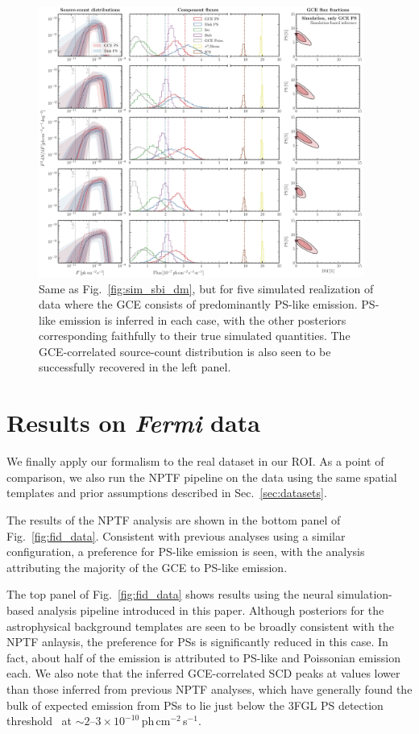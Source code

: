 \documentclass[prd,aps,10pt,nofootinbib,twocolumn,superscriptaddress,preprintnumbers,balancelastpage,longbibliography]{revtex4-1}
\begin{document}
%
\begin{figure}
    \centering
    \includegraphics[width=0.95\textwidth]{plots/sim_sbi_ps.pdf}
    \caption{Same as Fig.~\ref{fig:sim_sbi_dm}, but for five simulated realization of \Fermi data where the GCE consists of predominantly PS-like emission. PS-like emission is inferred in each case, with the other posteriors corresponding faithfully to their true simulated quantities. The GCE-correlated source-count distribution is also seen to be successfully recovered in the left panel.}
    \label{fig:sim_sbi_ps}
\end{figure}
%

\section{Results on \emph{Fermi} data}
\label{sec:data}

We finally apply our formalism to the real \Fermi dataset in our ROI. As a point of comparison, we also run the NPTF pipeline on the data using the same spatial templates and prior assumptions described in Sec.~\ref{sec:datasets}. 

The results of the NPTF analysis are shown in the bottom panel of Fig.~\ref{fig:fid_data}. Consistent with previous analyses using a similar configuration, a preference for PS-like emission is seen, with the analysis attributing the majority of the GCE to PS-like emission. 

The top panel of Fig.~\ref{fig:fid_data} shows results using the neural simulation-based analysis pipeline introduced in this paper. Although posteriors for the astrophysical background templates are seen to be broadly consistent with the NPTF anlaysis, the preference for PSs is significantly reduced in this case. In fact, about half of the emission is attributed to PS-like and Poissonian emission each. We also note that the inferred GCE-correlated SCD peaks at values lower than those inferred from previous NPTF analyses, which have generally found the bulk of expected emission from PSs to lie just below the 3FGL PS detection threshold~\cite{Lee:2015fea} at $\sim2$--$3\times 10^{-10}$\,ph\,cm$^{-2}$\,s$^{-1}$. 
\end{document}
